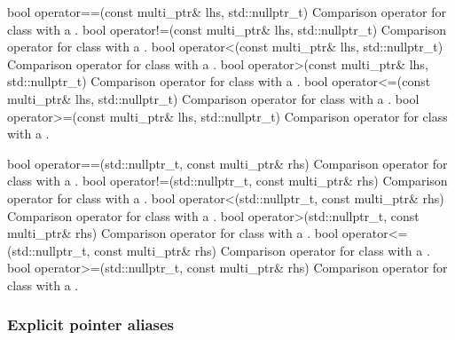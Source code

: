 \addRow
{bool operator==(const multi_ptr\& lhs, std::nullptr_t)}
{Comparison operator \codeinline{==} for  class with a
.}
\addRow
{bool operator!=(const multi_ptr\& lhs, std::nullptr_t)}
{Comparison operator \codeinline{!=} for  class with a
.}
\addRow
{bool operator<(const multi_ptr\& lhs, std::nullptr_t)}
{Comparison operator \codeinline{<} for  class with a
.}
\addRow
{bool operator>(const multi_ptr\& lhs, std::nullptr_t)}
{Comparison operator \codeinline{>} for  class with a
.}
\addRow
{bool operator<=(const multi_ptr\& lhs, std::nullptr_t)}
{Comparison operator \codeinline{<=} for  class with a
.}
\addRow
{bool operator>=(const multi_ptr\& lhs, std::nullptr_t)}
{Comparison operator \codeinline{>=} for  class with a
.}

\addRow
{bool operator==(std::nullptr_t, const multi_ptr\& rhs)}
{Comparison operator \codeinline{==} for  class with a
.}
\addRow
{bool operator!=(std::nullptr_t, const multi_ptr\& rhs)}
{Comparison operator \codeinline{!=} for  class with a
.}
\addRow
{bool operator<(std::nullptr_t, const multi_ptr\& rhs)}
{Comparison operator \codeinline{<} for  class with a
.}
\addRow
{bool operator>(std::nullptr_t, const multi_ptr\& rhs)}
{Comparison operator \codeinline{>} for  class with a
.}
\addRow
{bool operator<=(std::nullptr_t, const multi_ptr\& rhs)}
{Comparison operator \codeinline{<=} for  class with a
.}
\addRow
{bool operator>=(std::nullptr_t, const multi_ptr\& rhs)}
{Comparison operator \codeinline{>=} for  class with a
.}

\completeTable
\subsubsection{Explicit pointer aliases}
\label{sec:pointerclasses}


